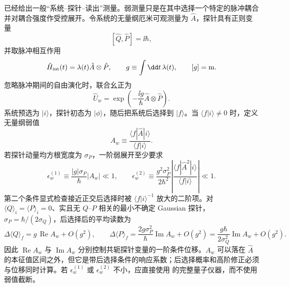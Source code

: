 \begin{exbox}[弱测量与弱值]
 已经给出一般“系统--探针--读出”测量。弱测量只是在其中选择一个特定的脉冲耦合并对耦合强度作受控展开。令系统的无量纲厄米可观测量为 $\hat A$，探针具有正则变量
\[
[\hat Q,\hat P]=\ii\hbar,
\]
并取脉冲相互作用
\begin{equation}
\hat H_{\rm int}(t)=\lambda(t)\hat A\otimes\hat P,
\qquad
g\equiv\int\dd t\,\lambda(t),
\qquad [g]={\rm m}.
\label{eq:weak_measurement_von_neumann_coupling}
\end{equation}
忽略脉冲期间的自由演化时，联合幺正为
\[
\hat U_w=\exp\!\left(-\frac{\ii g}{\hbar}\hat A\otimes\hat P\right).
\]
系统预选为 $|i\rangle$，探针初态为 $|\phi\rangle$，随后把系统后选择到 $|f\rangle$。当 $\langle f|i\rangle\neq0$ 时，定义无量纲弱值
\begin{equation}
\boxed{
A_w\equiv\frac{\langle f|\hat A|i\rangle}{\langle f|i\rangle}.}
\label{eq:weak_value_definition}
\end{equation}
若探针动量均方根宽度为 $\sigma_P$，一阶弱展开至少要求
\[
\epsilon_w^{(1)}
\equiv\frac{|g|\sigma_P}{\hbar}|A_w|\ll1,
\qquad
\epsilon_w^{(2)}
\equiv\frac{g^2\sigma_P^2}{2\hbar^2}
\left|\frac{\langle f|\hat A^2|i\rangle}{\langle f|i\rangle}\right|\ll1.
\]
第二个条件显式检查接近正交后选择时被 $\langle f|i\rangle^{-1}$ 放大的二阶项。对 $\langle Q\rangle_i=\langle P\rangle_i=0$、实且无 $Q$--$P$ 相关的最小不确定 Gaussian 探针，
$\sigma_P=\hbar/(2\sigma_Q)$，后选择后的平均读数为
\begin{equation}
\boxed{
\Delta\langle Q\rangle_f
=g\,\operatorname{Re}A_w+O(g^2),
\qquad
\Delta\langle P\rangle_f
=\frac{2g\sigma_P^2}{\hbar}\operatorname{Im}A_w+O(g^2)
=\frac{g\hbar}{2\sigma_Q^2}\operatorname{Im}A_w+O(g^2).}
\label{eq:weak_value_gaussian_meter_shifts}
\end{equation}
因此 $\operatorname{Re}A_w$ 与 $\operatorname{Im}A_w$ 分别控制共轭探针变量的一阶条件位移。$A_w$ 可以落在 $\hat A$ 的本征值区间之外，但它是带后选择条件的响应系数；后选择概率和高阶修正必须与位移同时计算。若 $\epsilon_w^{(1)}$ 或 $\epsilon_w^{(2)}$ 不小，应直接使用 的完整量子仪器，而不使用弱值截断。

\medskip


\end{exbox}

